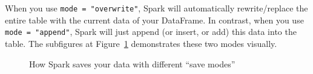 \documentclass[
  11pt,
  letterpaper,
  DIV=11,
  numbers=noendperiod]{scrreprt}
\begin{document}
When you use \texttt{mode\ =\ "overwrite"}, Spark will automatically
rewrite/replace the entire table with the current data of your
DataFrame. In contrast, when you use \texttt{mode\ =\ "append"}, Spark
will just append (or insert, or add) this data into the table. The
subfigures at Figure~\ref{fig-save-table-modes} demonstrates these two
modes visually.

\begin{figure}

\begin{minipage}{\linewidth}



\end{minipage}%
\newline
\begin{minipage}{\linewidth}



\end{minipage}%

\caption{\label{fig-save-table-modes}How Spark saves your data with
different ``save modes''}

\end{figure}%
\end{document}
